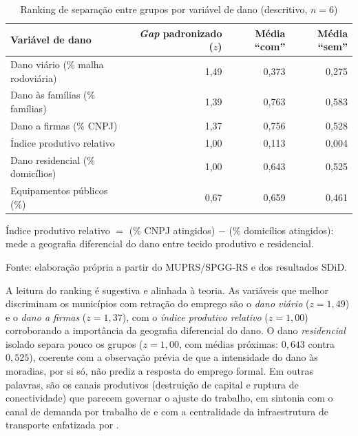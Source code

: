 \documentclass[a4paper,12pt]{article}
\begin{document}
\begin{table}[htbp]
\centering
\caption{Ranking de separação entre grupos por variável de dano (descritivo, $n=6$)}
\label{tab:het}
\begin{threeparttable}
\small
\begin{tabular}{l r r r}
\toprule
Variável de dano & \textit{Gap} padronizado ($z$) & Média ``com'' & Média ``sem'' \\
\midrule
Dano viário (\% malha rodoviária)        & 1,49 & 0,373 & 0,275 \\
Dano às famílias (\% famílias)           & 1,39 & 0,763 & 0,583 \\
Dano a firmas (\% CNPJ)                  & 1,37 & 0,756 & 0,528 \\
Índice produtivo relativo\tnote{a}       & 1,00 & 0,113 & 0,004 \\
Dano residencial (\% domicílios)         & 1,00 & 0,643 & 0,525 \\
Equipamentos públicos (\%)               & 0,67 & 0,659 & 0,461 \\
\bottomrule
\end{tabular}
\begin{tablenotes}[flushleft]
\footnotesize
\item[a] Índice produtivo relativo $=$ (\% CNPJ atingidos) $-$ (\% domicílios atingidos): mede a geografia diferencial do dano entre tecido produtivo e residencial.
\item Fonte: elaboração própria a partir do MUPRS/SPGG-RS e dos resultados SDiD.
\end{tablenotes}
\end{threeparttable}
\end{table}

A leitura do ranking é sugestiva e alinhada à teoria. As variáveis que melhor
discriminam os municípios com retração do emprego são o \emph{dano viário}
($z = 1{,}49$) e o \emph{dano a firmas} ($z = 1{,}37$), com o \emph{índice
produtivo relativo} ($z = 1{,}00$) corroborando a importância da geografia
diferencial do dano. O dano \emph{residencial} isolado separa pouco os grupos
($z = 1{,}00$, com médias próximas: $0{,}643$ contra $0{,}525$), coerente com
a observação prévia de que a intensidade do dano às moradias, por si só, não
prediz a resposta do emprego formal. Em outras palavras, são os canais
produtivos (destruição de capital e ruptura de conectividade) que parecem
governar o ajuste do trabalho, em sintonia com o canal de demanda por
trabalho de  e com a centralidade da infraestrutura
de transporte enfatizada por .
\end{document}
